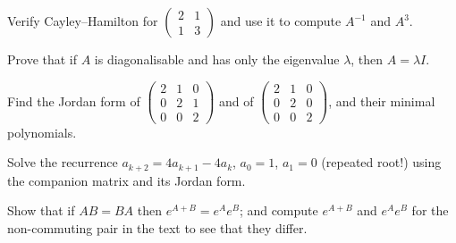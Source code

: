 \begin{exercise}
Verify Cayley--Hamilton for $\begin{pmatrix}2&1\\1&3\end{pmatrix}$ and use it to compute $A^{-1}$ and $A^3$.
\end{exercise}

\begin{exercise}
Prove that if $A$ is diagonalisable and has only the eigenvalue $\lambda$, then $A=\lambda I$.
\end{exercise}

\begin{exercise}
Find the Jordan form of $\begin{pmatrix}2&1&0\\0&2&1\\0&0&2\end{pmatrix}$ and of $\begin{pmatrix}2&1&0\\0&2&0\\0&0&2\end{pmatrix}$, and their minimal polynomials.
\end{exercise}

\begin{exercise}
Solve the recurrence $a_{k+2}=4a_{k+1}-4a_k$, $a_0=1$, $a_1=0$ (repeated root!) using the companion matrix and its Jordan form.
\end{exercise}

\begin{exercise}
Show that if $AB=BA$ then $e^{A+B}=e^Ae^B$; and compute $e^{A+B}$ and $e^Ae^B$ for the non-commuting pair in the text to see that they differ.
\end{exercise}
